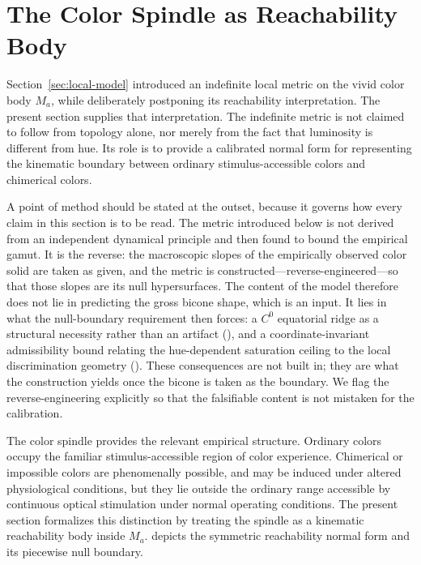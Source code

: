 \documentclass[preprint,12pt,authoryear]{elsarticle}
\theoremstyle{plain}
\theoremstyle{definition}
\theoremstyle{remark}
\begin{document}
\section{The Color Spindle as Reachability Body}
\label{sec:reachability}

Section~\ref{sec:local-model} introduced an indefinite local metric on the vivid color body $M_a$, while deliberately postponing its reachability interpretation. The present section supplies that interpretation. The indefinite metric is not claimed to follow from topology alone, nor merely from the fact that luminosity is different from hue. Its role is to provide a calibrated normal form for representing the kinematic boundary between ordinary stimulus-accessible colors and chimerical colors.

A point of method should be stated at the outset, because it governs how every claim in this section is to be read. The metric introduced below is not derived from an independent dynamical principle and then found to bound the empirical gamut. It is the reverse: the macroscopic slopes of the empirically observed color solid are taken as given, and the metric is constructed---reverse-engineered---so that those slopes are its null hypersurfaces. The content of the model therefore does not lie in predicting the gross bicone shape, which is an input. It lies in what the null-boundary requirement then forces: a $C^0$ equatorial ridge as a structural necessity rather than an artifact (), and a coordinate-invariant admissibility bound relating the hue-dependent saturation ceiling to the local discrimination geometry (). These consequences are not built in; they are what the construction yields once the bicone is taken as the boundary. We flag the reverse-engineering explicitly so that the falsifiable content is not mistaken for the calibration.

The color spindle \citep{Churchland2005} provides the relevant empirical structure. Ordinary colors occupy the familiar stimulus-accessible region of color experience. Chimerical or impossible colors are phenomenally possible, and may be induced under altered physiological conditions, but they lie outside the ordinary range accessible by continuous optical stimulation under normal operating conditions. The present section formalizes this distinction by treating the spindle as a kinematic reachability body inside $M_a$.  depicts the symmetric reachability normal form and its
piecewise null boundary.
\end{document}
